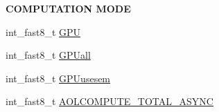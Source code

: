 \begin{Indent}{\bf C\+O\+M\+P\+U\+T\+A\+T\+I\+O\+N M\+O\+D\+E}\par
\begin{DoxyCompactItemize}
\item 
int\+\_\+fast8\+\_\+t \hyperlink{structAOLOOPCONTROL__CONF_a42b4f661c63f7441f0f8a4af89b1b216}{G\+P\+U}
\item 
int\+\_\+fast8\+\_\+t \hyperlink{structAOLOOPCONTROL__CONF_a65f4ffb63a04738926b536991745b909}{G\+P\+Uall}
\item 
int\+\_\+fast8\+\_\+t \hyperlink{structAOLOOPCONTROL__CONF_a98cd30703d34047c9741abe330e9be89}{G\+P\+Uusesem}
\item 
int\+\_\+fast8\+\_\+t \hyperlink{structAOLOOPCONTROL__CONF_aa8b85d6f44cbc4bb0058b8f6beadbd83}{A\+O\+L\+C\+O\+M\+P\+U\+T\+E\+\_\+\+T\+O\+T\+A\+L\+\_\+\+A\+S\+Y\+N\+C}
\end{DoxyCompactItemize}
\end{Indent}
